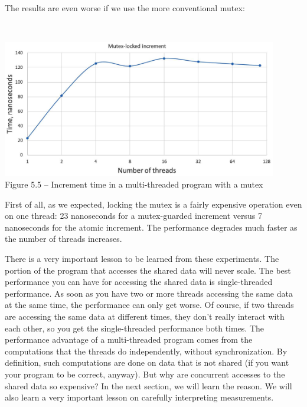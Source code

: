 The results are even worse if we use the more conventional mutex:

\hspace*{\fill} \\ %
\begin{center}
\includegraphics[width=0.9\textwidth]{content/1/chapter5/images/5.jpg}\\
Figure 5.5 – Increment time in a multi-threaded program with a mutex
\end{center}

First of all, as we expected, locking the mutex is a fairly expensive operation even on one thread: 23 nanoseconds for a mutex-guarded increment versus 7 nanoseconds for the atomic increment. The performance degrades much faster as the number of threads increases.

There is a very important lesson to be learned from these experiments. The portion of the program that accesses the shared data will never scale. The best performance you can have for accessing the shared data is single-threaded performance. As soon as you have two or more threads accessing the same data at the same time, the performance can only get worse. Of course, if two threads are accessing the same data at different times, they don't really interact with each other, so you get the single-threaded performance both times. The performance advantage of a multi-threaded program comes from the computations that the threads do independently, without synchronization. By definition, such computations are done on data that is not shared (if you want your program to be correct, anyway). But why are concurrent accesses to the shared data so expensive? In the next section, we will learn the reason. We will also learn a very important lesson on carefully interpreting measurements.








